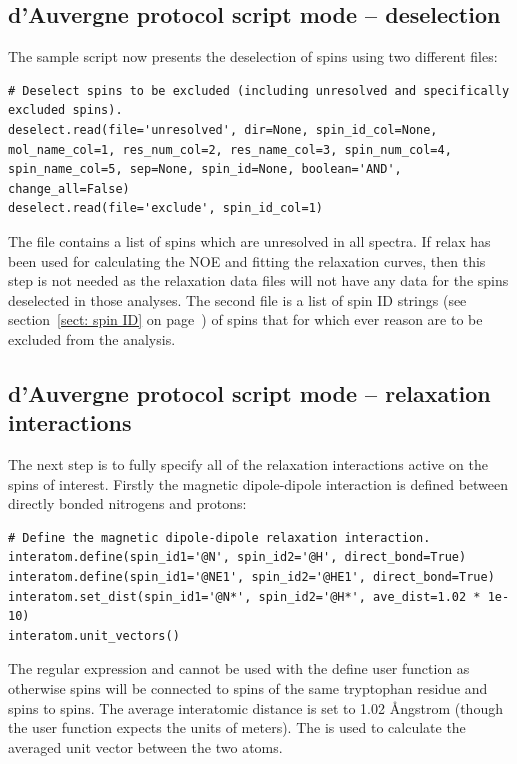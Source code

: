 \begin{htmlonly}
\begin{htmlonly}

\subsection{d'Auvergne protocol script mode -- deselection}

The sample script now presents the deselection of spins using two different files:

\begin{lstlisting}[firstnumber=188]
# Deselect spins to be excluded (including unresolved and specifically excluded spins).
deselect.read(file='unresolved', dir=None, spin_id_col=None, mol_name_col=1, res_num_col=2, res_name_col=3, spin_num_col=4, spin_name_col=5, sep=None, spin_id=None, boolean='AND', change_all=False)
deselect.read(file='exclude', spin_id_col=1)
\end{lstlisting}

The  file contains a list of spins which are unresolved in all spectra.
If relax has been used for calculating the NOE and fitting the relaxation curves, then this step is not needed as the relaxation data files will not have any data for the spins deselected in those analyses.
The second file  is a list of spin ID strings (see section~\ref{sect: spin ID} on page~\pageref{sect: spin ID}) of spins that for which ever reason are to be excluded from the analysis.



\subsection{d'Auvergne protocol script mode -- relaxation interactions}

The next step is to fully specify all of the relaxation interactions active on the spins of interest.
Firstly the magnetic dipole-dipole interaction is defined between directly bonded nitrogens and protons:

\begin{lstlisting}[firstnumber=192]
# Define the magnetic dipole-dipole relaxation interaction.
interatom.define(spin_id1='@N', spin_id2='@H', direct_bond=True)
interatom.define(spin_id1='@NE1', spin_id2='@HE1', direct_bond=True)
interatom.set_dist(spin_id1='@N*', spin_id2='@H*', ave_dist=1.02 * 1e-10)
interatom.unit_vectors()
\end{lstlisting}

The regular expression  and  cannot be used with the  define user function as otherwise  spins will be connected to  spins of the same tryptophan residue and  spins to  spins.
The average interatomic distance is set to 1.02 \AA ngstrom (though the  user function expects the units of meters).
The  is used to calculate the averaged unit vector between the two atoms.


\end{htmlonly}
\end{htmlonly}
